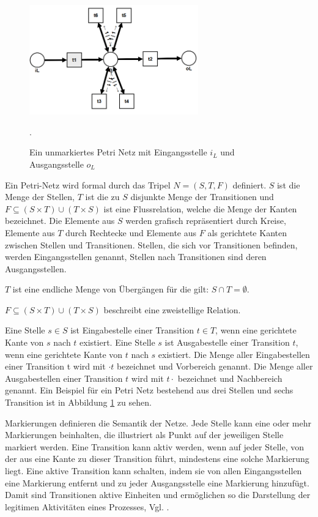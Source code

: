 \begin{figure}[!h]
    \centering
    \includegraphics[width=0.65\textwidth]{figures/Appbildungen/petriNetFlower.png}
    \caption{Ein unmarkiertes Petri Netz mit Eingangsstelle $i_L$ und Ausgangsstelle $o_L$}.
    \label{fig:exampleFlower}
\end{figure}
Ein Petri-Netz wird formal durch das Tripel $N = (S, T, F)$ definiert. $S$ ist die Menge der Stellen, $T$  ist  die  zu  $S$  disjunkte  Menge  der  Transitionen  und  $F⊆ (S ×  T) ∪ (T  ×  S) $ ist  eine Flussrelation,  welche  die  Menge  der  Kanten  bezeichnet.  Die  Elemente  aus  $S$  werden grafisch repräsentiert durch Kreise, Elemente aus $T$ durch Rechtecke und Elemente aus $F$ als gerichtete Kanten zwischen Stellen und Transitionen. Stellen,  die  sich  vor  Transitionen  befinden, werden Eingangsstellen genannt, Stellen nach Transitionen sind deren Ausgangsstellen. 

$T$ ist eine endliche Menge von Übergängen für die gilt: $S ∩ T =  ∅.$

$F ⊆(S × T) ∪ (T × S)$ beschreibt eine zweistellige Relation.

Eine  Stelle  $s∈S$  ist  Eingabestelle  einer  Transition  $t∈T$,  wenn  eine  gerichtete  Kante  von $s$ nach $t$ existiert. Eine Stelle $s$ ist Ausgabestelle einer Transition $ t$, wenn eine gerichtete Kante von $t$ nach $s$ existiert. Die Menge aller Eingabestellen einer Transition t wird mit $\cdot t$ bezeichnet und Vorbereich genannt. Die Menge aller Ausgabestellen einer Transition $t$ wird mit $t \cdot$ bezeichnet und Nachbereich genannt. Ein Beispiel für ein Petri Netz bestehend aus drei Stellen und sechs Transition ist in Abbildung \ref{fig:exampleFlower} zu sehen.

Markierungen definieren die Semantik der Netze. Jede Stelle kann eine oder mehr Markierungen beinhalten, die illustriert als Punkt auf der jeweiligen Stelle markiert werden. Eine Transition kann aktiv werden, wenn auf jeder Stelle, von der aus eine Kante zu dieser Transition führt, mindestens eine solche Markierung liegt. Eine aktive Transition kann schalten, indem sie von allen Eingangsstellen eine Markierung entfernt und zu jeder Ausgangsstelle eine Markierung hinzufügt. Damit sind Transitionen aktive Einheiten und ermöglichen so die Darstellung der legitimen Aktivitäten eines Prozesses, Vgl. \cite{Petrinetze}.
\newpage
